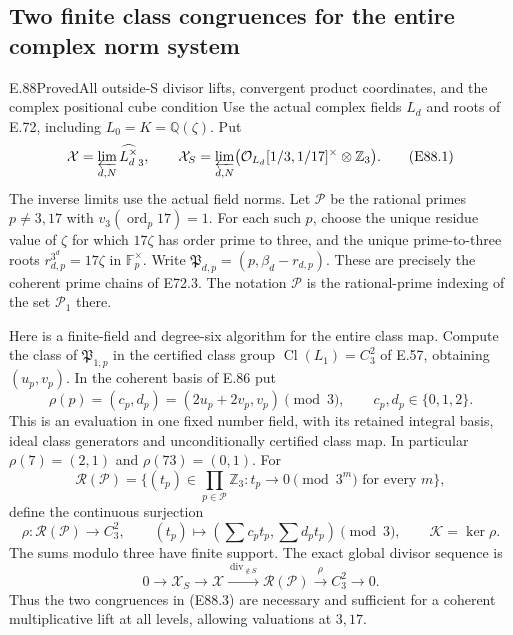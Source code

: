 \subsection{Two finite class congruences for the entire complex norm system}

\begin{statement}{E.88}{Proved}{All outside-S divisor lifts, convergent product coordinates, and the complex positional cube condition}
Use the actual complex fields $L_d$ and roots of E.72,
including $L_0=K=\mathbb Q(\zeta)$. Put
\[
 \mathcal X=\varprojlim_{d,N}\widehat{L_d^\times}_3,\qquad
 \mathcal X_S=\varprojlim_{d,N}
       \bigl(\mathcal O_{L_d}[1/3,1/17]^\times\otimes\mathbb Z_3\bigr).
 \tag{E88.1}
\]
The inverse limits use the actual field norms. Let $\mathcal P$
be the rational primes $p\ne3,17$ with
$v_3(\operatorname{ord}_p17)=1$. For each such $p$, choose the
unique residue value of $\zeta$ for which $17\zeta$ has order
prime to three, and the unique prime-to-three roots
$r_{d,p}^{3^d}=17\zeta$ in $\mathbb F_p^\times$. Write
$\mathfrak P_{d,p}=(p,\beta_d-r_{d,p})$.
These are precisely the coherent prime chains of E72.3.
The notation $\mathcal P$ is the rational-prime indexing
of the set $\mathcal P_1$ there.

Here is a finite-field and degree-six algorithm for the
entire class map. Compute the class of
$\mathfrak P_{1,p}$ in the certified class group
$\operatorname{Cl}(L_1)=C_3^2$ of E.57, obtaining $(u_p,v_p)$.
In the coherent basis of E.86 put
\[
 \rho(p)=(c_p,d_p)=(2u_p+2v_p,v_p)\pmod3,\qquad
             c_p,d_p\in\{0,1,2\}.
 \tag{E88.2}
\]
This is an evaluation in one fixed number field, with
its retained integral basis, ideal class generators and
unconditionally certified class map. In particular
$\rho(7)=(2,1)$ and $\rho(73)=(0,1)$.
For
\[
 \mathscr R(\mathcal P)
 =\{(t_p)\in\prod_{p\in\mathcal P}\mathbb Z_3:
                         t_p\longrightarrow0\pmod{3^m}
                         \text{ for every }m\},
\]
define the continuous surjection
\[
 \rho:\mathscr R(\mathcal P)\longrightarrow C_3^2,\qquad
       (t_p)\longmapsto
         \left(\sum c_pt_p,\sum d_pt_p\right)\pmod3,
 \qquad \mathcal K=\ker\rho .
 \tag{E88.3}
\]
The sums modulo three have finite support. The exact
global divisor sequence is
\[
 0\longrightarrow\mathcal X_S
 \longrightarrow\mathcal X
 \xrightarrow{\ \operatorname{div}_{\notin S}\ }
       \mathscr R(\mathcal P)
 \xrightarrow{\ \rho\ }C_3^2
 \longrightarrow0 .
 \tag{E88.4}
\]
Thus the two congruences in (E88.3) are necessary and
sufficient for a coherent multiplicative lift at all
levels, allowing valuations at $3,17$.


\end{statement}
